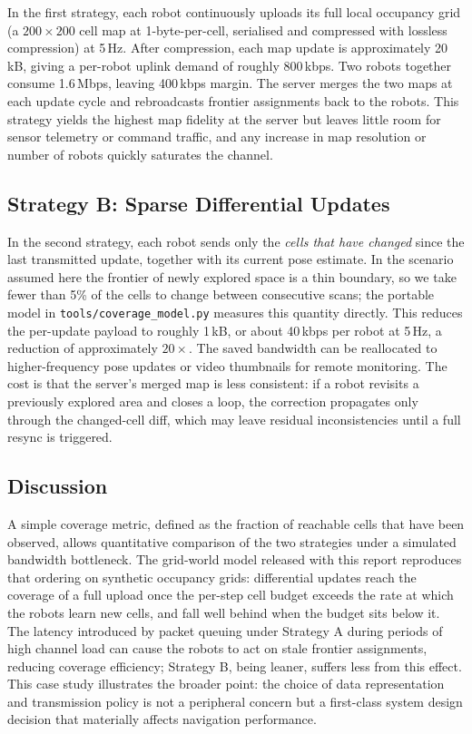 In the first strategy, each robot continuously uploads its full local occupancy grid
(a \(200 \times 200\) cell map at 1-byte-per-cell, serialised and compressed with
lossless compression) at 5\,Hz.
After compression, each map update is approximately 20\,kB, giving a per-robot uplink
demand of roughly 800\,kbps.
Two robots together consume 1.6\,Mbps, leaving 400\,kbps margin.
The server merges the two maps at each update cycle and rebroadcasts frontier
assignments back to the robots.
This strategy yields the highest map fidelity at the server but leaves little room
for sensor telemetry or command traffic, and any increase in map resolution or number
of robots quickly saturates the channel.

\subsection*{Strategy B: Sparse Differential Updates}

In the second strategy, each robot sends only the \emph{cells that have changed}
since the last transmitted update, together with its current pose estimate.
In the scenario assumed here the frontier of newly explored space is a thin boundary, so
we take fewer than 5\% of the cells to change between consecutive scans; the portable model
in \texttt{tools/coverage\_model.py} measures this quantity directly.
This reduces the per-update payload to roughly 1\,kB, or about 40\,kbps per robot at
5\,Hz, a reduction of approximately \(20\times\).
The saved bandwidth can be reallocated to higher-frequency pose updates or video
thumbnails for remote monitoring.
The cost is that the server's merged map is less consistent: if a robot revisits a
previously explored area and closes a loop, the correction propagates only through the
changed-cell diff, which may leave residual inconsistencies until a full resync is
triggered.

\subsection*{Discussion}

A simple coverage metric, defined as the fraction of reachable cells that have been
observed, allows quantitative comparison of the two strategies under a simulated
bandwidth bottleneck.
The grid-world model released with this report reproduces that ordering on synthetic
occupancy grids: differential updates reach the coverage of a full upload once the
per-step cell budget exceeds the rate at which the robots learn new cells, and fall well
behind when the budget sits below it.
The latency introduced by packet queuing under Strategy A during periods of high
channel load can cause the robots to act on stale frontier assignments, reducing
coverage efficiency; Strategy B, being leaner, suffers less from this effect.
This case study illustrates the broader point: the choice of data representation and
transmission policy is not a peripheral concern but a first-class system design decision
that materially affects navigation performance.

